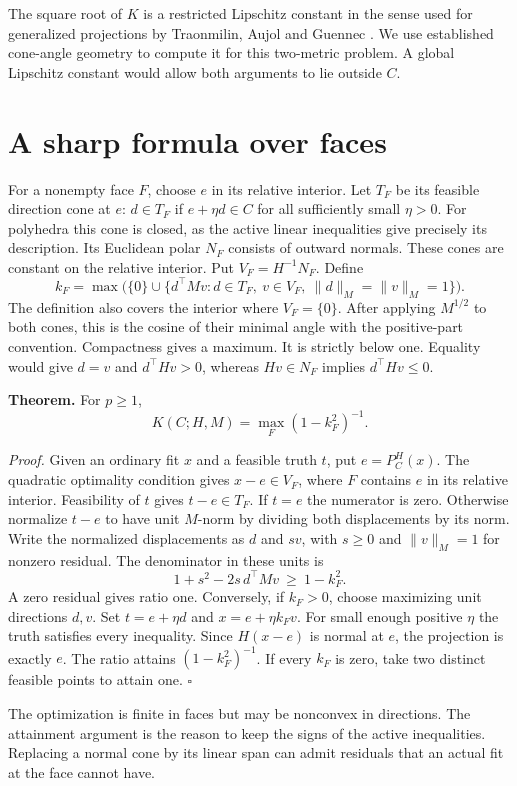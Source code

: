 \documentclass[11pt]{article}
\begin{document}
The square root of $K$ is a restricted Lipschitz constant in the sense used for generalized projections by Traonmilin, Aujol and Guennec \cite{tag}. We use established cone-angle geometry \cite{bow} to compute it for this two-metric problem. A global Lipschitz constant would allow both arguments to lie outside $C$.

\newpage
\section{A sharp formula over faces}
For a nonempty face $F$, choose $e$ in its relative interior. Let $T_F$ be its feasible direction cone at $e$: $d\in T_F$ if $e+\eta d\in C$ for all sufficiently small $\eta>0$. For polyhedra this cone is closed, as the active linear inequalities give precisely its description. Its Euclidean polar $N_F$ consists of outward normals. These cones are constant on the relative interior. Put $V_F=H^{-1}N_F$. Define
\[
 k_F=\max\bigl(\{0\}\cup\{d^\top Mv:
     d\in T_F,\ v\in V_F,\ \|d\|_M=\|v\|_M=1\}\bigr).
\]
The definition also covers the interior where $V_F=\{0\}$. After applying $M^{1/2}$ to both cones, this is the cosine of their minimal angle with the positive-part convention. Compactness gives a maximum. It is strictly below one. Equality would give $d=v$ and $d^\top Hv>0$, whereas $Hv\in N_F$ implies $d^\top Hv\leq0$.

\textbf{Theorem.} For $p\geq1$,
\[
                 K(C;H,M)=\max_F (1-k_F^2)^{-1}.
\]

\textit{Proof.} Given an ordinary fit $x$ and a feasible truth $t$, put $e=P_C^H(x)$. The quadratic optimality condition gives $x-e\in V_F$, where $F$ contains $e$ in its relative interior. Feasibility of $t$ gives $t-e\in T_F$. If $t=e$ the numerator is zero. Otherwise normalize $t-e$ to have unit $M$-norm by dividing both displacements by its norm. Write the normalized displacements as $d$ and $sv$, with $s\geq0$ and $\|v\|_M=1$ for nonzero residual. The denominator in these units is
\[
            1+s^2-2s\,d^\top Mv\ \geq\ 1-k_F^2.
\]
A zero residual gives ratio one. Conversely, if $k_F>0$, choose maximizing unit directions $d,v$. Set $t=e+\eta d$ and $x=e+\eta k_Fv$. For small enough positive $\eta$ the truth satisfies every inequality. Since $H(x-e)$ is normal at $e$, the projection is exactly $e$. The ratio attains $(1-k_F^2)^{-1}$. If every $k_F$ is zero, take two distinct feasible points to attain one. \hfill$\square$

The optimization is finite in faces but may be nonconvex in directions. The attainment argument is the reason to keep the signs of the active inequalities. Replacing a normal cone by its linear span can admit residuals that an actual fit at the face cannot have.
\end{document}
